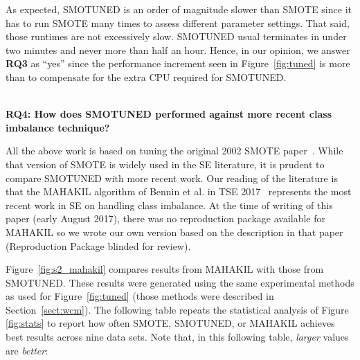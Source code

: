 \documentclass[sigconf,review, anonymous]{acmart}
\theoremstyle{break}
\theoremstyle{break}
\newcommand{\sma}{{\sc SMOTE}}
\newcommand{\smb}{{\sc SMOTUNED}}
\begin{document}
As expected,  {\smb} is an order of magnitude slower than {\sma} since
it has to run {\sma} many times to assess different parameter settings.
That said, those runtimes are not excessively slow.
{\smb} usual terminates in under two minutes and never more than half an hour.
Hence, in  our opinion, we answer {\bf RQ3} as ``yes'' since the   performance increment
seen in Figure~\ref{fig:tuned} is more than to compensate for the extra CPU required for {\smb}.

\noindent
{\bf \\RQ4: How does SMOTUNED performed against more recent class imbalance technique?}

All the above work is based on tuning the original 2002 {\sma} paper~\cite{chawla2002smote}. While that
version of {\sma} is widely used in the SE literature, 
it is prudent to compare {\smb} with more recent work.
Our reading
of the literature is that the MAHAKIL algorithm  of Bennin et al. in TSE 2017~\cite{bennin2017mahakil} represents the most recent work in  SE on handling  
class imbalance.  
At the time of writing of this paper (early August 2017), there was no reproduction package available for MAHAKIL so we wrote our own version
based on the description in that paper (Reproduction Package blinded for review). %

Figure~\ref{fig:s2_mahakil} compares   results from MAHAKIL with those from {\smb}. These results
were generated using the same experimental methods as used for   Figure~\ref{fig:tuned} (those methods were described in  Section~\ref{sect:wcm}).
The following table repeats   the statistical analysis of Figure \ref{fig:stats} to report how often
  {\sma}, {\smb}, or MAHAKIL achieves best results across nine data sets.   Note that, in this following table, {\em larger} values are {\em better}:
\end{document}
